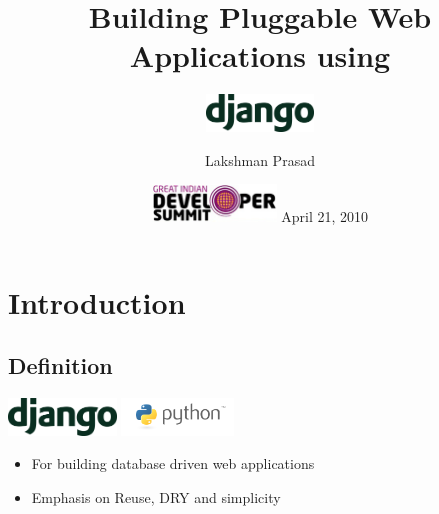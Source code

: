 \documentclass[19.9pt]{beamer}
\title{Building Pluggable Web Applications using
}
\institute{Agiliq Solutions}
\subtitle{\includegraphics[height=1cm]{images/django.png}}
\author{Lakshman Prasad}
\date{
	\includegraphics[height=1cm]{images/GIDS_Logo.jpg}\linebreak
	April 21, 2010}
\begin{document}
\begin{frame}
	\titlepage
\end{frame}

\section{Introduction}
	\subsection{Definition}
		{ 
		\begin{frame}
			{\includegraphics[height=1cm]{images/django.png}\linebreak
				\includegraphics[height=1cm]{images/python-logo.png}}
		\begin{itemize}                                                 				\item
			For building \alert{database driven} web applications                 \pause \item
			Emphasis on Reuse, DRY and simplicity
		\end{itemize}
		\end{frame}
		}
\end{document}
